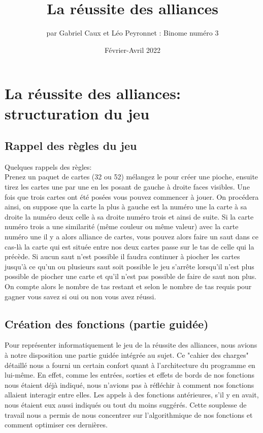 \documentclass[10pt,a4paper,french,titlepage]{article}
\author{par Gabriel Caux et Léo Peyronnet : Binome numéro 3}
\title{La réussite des alliances}
\date{Février-Avril 2022}
\theoremstyle{definition}
\begin{document}
\maketitle
\tableofcontents
\section{La réussite des alliances: structuration du jeu}
\subsection{Rappel des règles du jeu}
Quelques rappels des règles: \\
Prenez un paquet de cartes (32 ou 52) mélangez le pour créer une pioche, ensuite tirez les cartes une par une en les posant de gauche à droite faces visibles. Une fois que trois cartes ont été posées vous pouvez commencer à jouer. On procédera ainsi, on suppose que la carte la plus à gauche est la numéro une la carte à sa droite la numéro deux celle à sa droite numéro trois et ainsi de suite. Si la carte numéro trois a une similarité (même couleur ou même valeur) avec la carte numéro une il y a alors alliance de cartes, vous pouvez alors faire un saut dans ce cas-là la carte qui est située entre nos deux cartes passe sur le tas de celle qui la précède. Si aucun saut n'est possible il faudra continuer à piocher les cartes jusqu'à ce qu'un ou plusieurs saut soit possible le jeu s'arrête lorsqu'il n'est plus possible de piocher une carte et qu'il n'est pas possible de faire de saut non plus. On compte alors le nombre de tas restant et selon le nombre de tas requis pour gagner vous savez si oui ou non vous avez réussi.

\subsection{Création des fonctions (partie guidée)}
Pour représenter informatiquement le jeu de la réussite des alliances, nous avions à notre disposition une partie guidée intégrée au sujet. Ce "cahier des charges" détaillé nous a fourni un certain confort quant à l'architecture du programme en lui-même. En effet, comme les entrées, sorties et effets de bords de nos fonctions nous étaient déjà indiqué, nous n'avions pas à réfléchir à comment nos fonctions allaient interagir entre elles. Les appels à des fonctions antérieures, s'il y en avait, nous étaient eux aussi indiqués ou tout du moins suggérés. Cette souplesse de travail nous a permis de nous concentrer sur l'algorithmique de nos fonctions et comment optimiser ces dernières.\\
\end{document}
